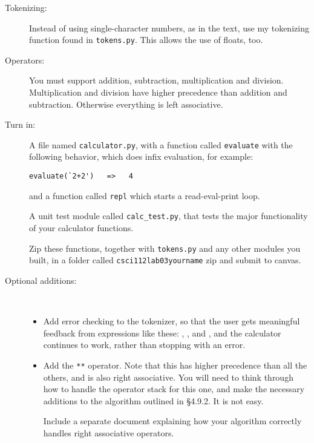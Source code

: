 \documentclass{article}
\newcommand{\bi}{\begin{itemize}}
\newcommand{\li}{\item}
\newcommand{\ei}{\end{itemize}}
\begin{document}
\begin{description}
\begin{enumerate}
\end{enumerate}


\item[Tokenizing:]  Instead of using single-character numbers, as in the text,
use my tokenizing function found in \lstinline{tokens.py}.  This allows the use
of floats, too. 


\item[Operators:] You must support addition, subtraction, multiplication
and division.  Multiplication and division have higher precedence than 
addition and subtraction.  Otherwise everything is left associative.

\item[Turn in:]  A file named \lstinline{calculator.py}, with a function
called \lstinline{evaluate} with the following behavior, which does infix
evaluation, for example:
\begin{lstlisting}
evaluate(`2+2')   =>   4
\end{lstlisting}
and a function called \lstinline{repl} which starts a read-eval-print loop.

A unit test module called \lstinline{calc_test.py}, that tests the major
functionality of your calculator functions.

Zip these functions, together with \lstinline{tokens.py} and any other
modules you built, in a folder called \lstinline{csci112lab03yourname} zip and submit to canvas.

\item[Optional additions:]~ 

\bi
\li Add error checking to the tokenizer, so that the user gets meaningful
feedback from expressions like these:
, 
, and
,
and the calculator continues to work, rather than stopping with an error.

\li Add the \lstinline{**} operator.  Note that this has higher precedence
than all the others, and is also right associative.  You will need to think through
how to handle the operator stack for this one, and make the necessary
additions to the algorithm outlined in \S 4.9.2.  It is not easy.

Include  a separate document explaining how your
algorithm correctly handles right associative operators.




\ei


\end{description}
\end{document}
